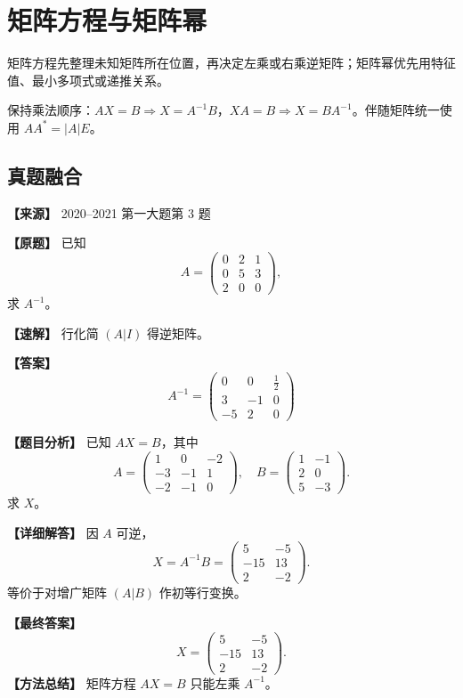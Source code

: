 \documentclass[11pt,a4paper,UTF8]{ctexart}
\begin{document}
\section{矩阵方程与矩阵幂}

\begin{identifybox}[识别]
矩阵方程先整理未知矩阵所在位置，再决定左乘或右乘逆矩阵；矩阵幂优先用特征值、最小多项式或递推关系。
\end{identifybox}
\begin{templatebox}[考场模板]
保持乘法顺序：$AX=B\Rightarrow X=A^{-1}B$，$XA=B\Rightarrow X=BA^{-1}$。伴随矩阵统一使用 $AA^*=|A|E$。
\end{templatebox}

\subsection{真题融合}

\begin{answerbox}
\textbf{【来源】} 2020--2021 第一大题第 3 题

\textbf{【原题】}
已知
\[
A=\begin{pmatrix}0&2&1\\0&5&3\\2&0&0\end{pmatrix},
\]
求 $A^{-1}$。

\textbf{【速解】}
行化简 $(A|I)$ 得逆矩阵。

\textbf{【答案】}
\[A^{-1}=\begin{pmatrix}0&0&\frac12\\3&-1&0\\-5&2&0\end{pmatrix}\]
\end{answerbox}

\begin{answerbox}
\textbf{【题目分析】} 已知 $AX=B$，其中
\[
A=\begin{pmatrix}1&0&-2\\-3&-1&1\\-2&-1&0\end{pmatrix},\quad
B=\begin{pmatrix}1&-1\\2&0\\5&-3\end{pmatrix}.
\]
求 $X$。

\textbf{【详细解答】} 因 $A$ 可逆，
\[
X=A^{-1}B
=\begin{pmatrix}5&-5\\-15&13\\2&-2\end{pmatrix}.
\]
等价于对增广矩阵 $(A|B)$ 作初等行变换。

\textbf{【最终答案】}
\[
X=\begin{pmatrix}5&-5\\-15&13\\2&-2\end{pmatrix}.
\]
\textbf{【方法总结】} 矩阵方程 $AX=B$ 只能左乘 $A^{-1}$。
\end{answerbox}
\end{document}
